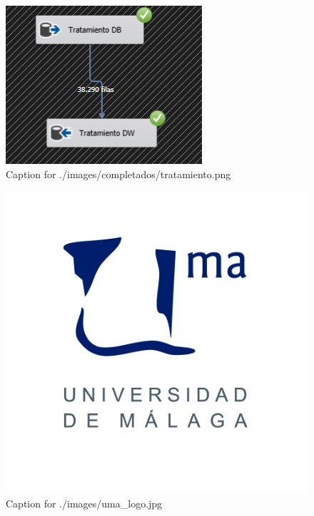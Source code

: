 \documentclass{article}
\begin{document}
\begin{figure}[H]
  \centering
  \includegraphics[width=\linewidth]{./images/completados/tratamiento.png}
  \caption{Caption for ./images/completados/tratamiento.png}
\end{figure}
\begin{figure}[H]
  \centering
  \includegraphics[width=\linewidth]{./images/uma_logo.jpg}
  \caption{Caption for ./images/uma_logo.jpg}
\end{figure}
\end{document}
